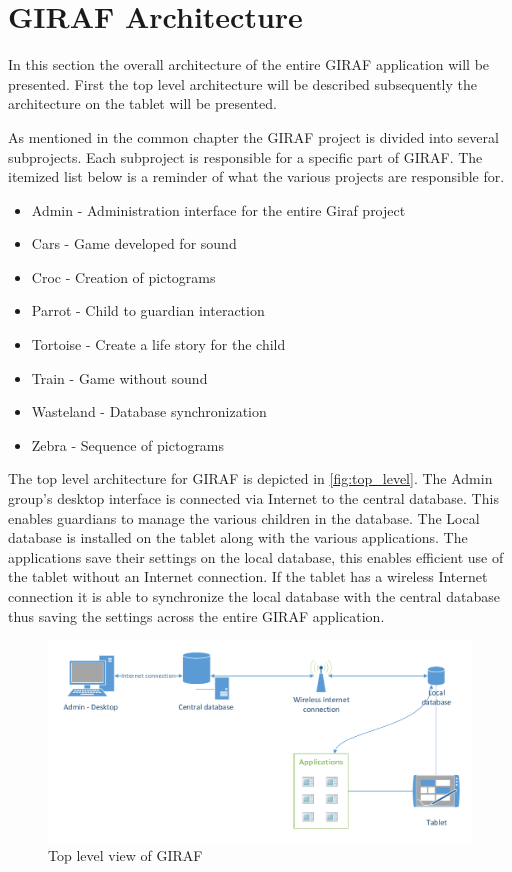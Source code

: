 \section{GIRAF Architecture}
In this section the overall architecture of the entire GIRAF application will be presented. First the top level architecture will be described subsequently the architecture on the tablet will be presented.

As mentioned in the common chapter  the GIRAF project is divided into several subprojects. Each subproject is responsible for a specific part of GIRAF. The itemized list below is a reminder of what the various projects are responsible for.

\begin{itemize}
	\item Admin - Administration interface for the entire Giraf project
	\item Cars - Game developed for sound
	\item Croc - Creation of pictograms
	\item Parrot - Child to guardian interaction
	\item Tortoise - Create a life story for the child
	\item Train - Game without sound
	\item Wasteland - Database synchronization
	\item Zebra - Sequence of pictograms
\end{itemize}

The top level architecture for GIRAF is depicted in \autoref{fig:top_level}. The Admin group's desktop interface is connected via Internet to the central database. This enables guardians to manage the various children in the database. The Local database is installed on the tablet along with the various applications. The applications save their settings on the local database, this enables efficient use of the tablet without an Internet connection. If the tablet has a wireless Internet connection it is able to synchronize the local database with the central database thus saving the settings across the entire GIRAF application. 

\begin{figure}[htpb]
\includegraphics[width=\textwidth]{img/top_level.pdf}
\caption{Top level view of GIRAF}
\label{fig:top_level}
\end{figure}

